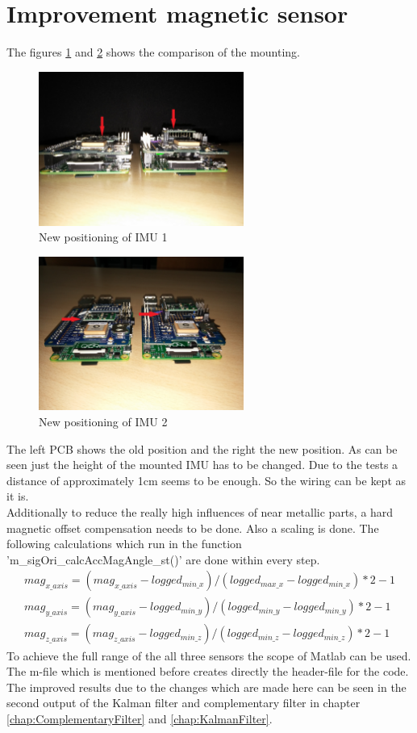 \section{Improvement magnetic sensor}
\label{sec:ImpMagSens}
The figures \ref{fig:pos_neu1} and \ref{fig:pos_neu2} shows the comparison of the mounting.
\begin{figure}[H]
	\centering\includegraphics[width=0.6\textwidth]{fig/pos_neu1}
	\caption{New positioning of IMU 1}
	\label{fig:pos_neu1}
\end{figure}
\begin{figure}[H]
	\centering\includegraphics[width=0.6\textwidth]{fig/pos_neu2}
	\caption{New positioning of IMU 2}
	\label{fig:pos_neu2}
\end{figure}
The left PCB shows the old position and the right the new position. As can be seen just the height of the mounted IMU has to be changed. Due to the tests a distance of approximately 1cm seems to be enough. So the wiring can be kept as it is.\\
Additionally to reduce the really high influences of near metallic parts, a hard magnetic offset compensation needs to be done. Also a scaling is done. The following calculations which run in the function 'm\_sigOri\_calcAccMagAngle\_st()' are done within every step.
\begin{align}
mag_{x\_axis}=(mag_{x\_axis}-logged_{min\_x})/(logged_{max\_x}-logged_{min\_x})*2-1\\
mag_{y\_axis}=(mag_{y\_axis}-logged_{min\_y})/(logged_{min\_y}-logged_{min\_y})*2-1\\
mag_{z\_axis}=(mag_{z\_axis}-logged_{min\_z})/(logged_{min\_z}-logged_{min\_z})*2-1
\end{align}
To achieve the full range of the all three sensors the scope of Matlab can be used. The m-file which is mentioned before creates directly the header-file for the code. The improved results due to the changes which are made here can be seen in the second output of the Kalman filter and complementary filter in chapter \ref{chap:ComplementaryFilter} and \ref{chap:KalmanFilter}.